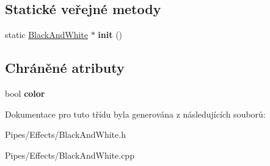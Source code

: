 \subsection*{Statické veřejné metody}
\begin{DoxyCompactItemize}
\item 
\hypertarget{class_ar_pipe_1_1_black_and_white_a1acbe16ae97d80527a5dc4f286a172ee}{static \hyperlink{class_ar_pipe_1_1_black_and_white}{Black\-And\-White} $\ast$ {\bfseries init} ()}\label{df/d31/class_ar_pipe_1_1_black_and_white_a1acbe16ae97d80527a5dc4f286a172ee}

\end{DoxyCompactItemize}
\subsection*{Chráněné atributy}
\begin{DoxyCompactItemize}
\item 
\hypertarget{class_ar_pipe_1_1_black_and_white_a4814162cf5714b5bbebe3e4a69a19676}{bool {\bfseries color}}\label{df/d31/class_ar_pipe_1_1_black_and_white_a4814162cf5714b5bbebe3e4a69a19676}

\end{DoxyCompactItemize}


Dokumentace pro tuto třídu byla generována z následujících souborů\-:\begin{DoxyCompactItemize}
\item 
Pipes/\-Effects/Black\-And\-White.\-h\item 
Pipes/\-Effects/Black\-And\-White.\-cpp\end{DoxyCompactItemize}
